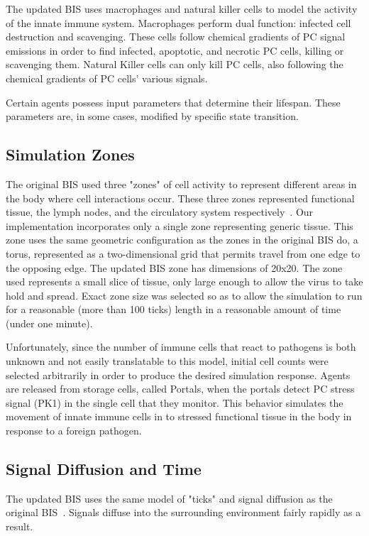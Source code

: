 \documentclass[10pt,conference]{IEEEtran}
\begin{document}
\indent
The updated BIS uses macrophages and natural killer cells to model the activity
of the innate immune system. Macrophages perform dual function: infected cell
destruction and scavenging. These cells follow chemical gradients of PC signal
emissions in order to find infected, apoptotic, and necrotic PC cells, killing
or scavenging them. Natural Killer cells can only kill PC cells, also following
the chemical gradients of PC cells' various signals.

\indent
Certain agents possess input parameters that determine their lifespan. These
parameters are, in some cases, modified by specific state transition.

\subsection{Simulation Zones}
The original BIS used three "zones" of cell activity to represent different
areas in the body where cell interactions occur. These three zones represented
functional tissue, the lymph nodes, and the circulatory system
respectively~\cite{Folcik:2007}. Our implementation incorporates only a single
zone representing generic tissue.  This zone uses the same geometric
configuration as the zones in the original BIS do, a torus, represented as a
two-dimensional grid that permits travel from one edge to the opposing edge.
The updated BIS zone has dimensions of 20x20. The zone used represents a small
slice of tissue, only large enough to allow the virus to take hold and spread.
Exact zone size was selected so as to allow the simulation to run for a
reasonable (more than 100 ticks) length in a reasonable amount of time (under
one minute).

\indent
Unfortunately, since the number of immune cells that react to pathogens is both
unknown and not easily translatable to this model, initial cell counts were
selected arbitrarily in order to produce the desired simulation response.
Agents are released from storage cells, called Portals, when the portals detect
PC stress signal (PK1) in the single cell that they monitor. This behavior
simulates the movement of innate immune cells in to stressed functional tissue
in the body in response to a foreign pathogen.

\subsection{Signal Diffusion and Time}
The updated BIS uses the same model of "ticks" and signal diffusion as the
original BIS~\cite{Folcik:2007}. Signals diffuse into the surrounding
environment fairly rapidly as a result.
\end{document}
